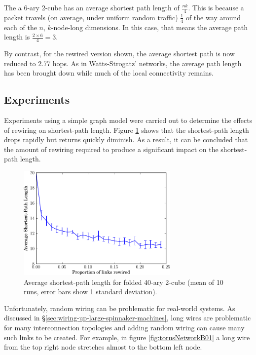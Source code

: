 			The a 6-ary 2-cube has an average shortest path length of $\frac{nk}{4}$.
			This is because a packet travels (on average, under uniform random
			traffic) $\frac{1}{4}$ of the way around each of the $n$, $k$-node-long
			dimensions. In this case, that means the average path length is $\frac{2
			\times 6}{4} = 3$.
			
			By contrast, for the rewired version shown, the average shortest path is
			now reduced to 2.77 hops. As in Watts-Strogatz' networks, the average path
			length has been brought down while much of the local connectivity remains.
		
		
		\subsection{Experiments}
			
			Experiments using a simple graph model were carried out to determine the
			effects of rewiring on shortest-path length. Figure
			\ref{fig:smallWorldTorus} shows that the shortest-path length drops
			rapidly but returns quickly diminish. As a result, it can be concluded
			that the amount of rewiring required to produce a significant impact on
			the shortest-path length.
			
			\begin{figure}
				\center
				\includegraphics[width=0.7\textwidth]{figures/smallWorldTorus}
				\caption[Average shortest-path length for folded 40-ary 2-cube.]{Average
				shortest-path length for folded 40-ary 2-cube (mean of 10 runs, error
				bars show 1 standard deviation).}
				\label{fig:smallWorldTorus}
			\end{figure}
			
			Unfortunately, random wiring can be problematic for real-world systems.
			As discussed in \S\ref{sec:wiring-up-large-spinnaker-machines}, long wires
			are problematic for many interconnection topologies and adding random
			wiring can cause many such links to be created. For example, in figure
			\ref{fig:torusNetworkB01} a long wire from the top right node stretches
			almost to the bottom left node.
			
